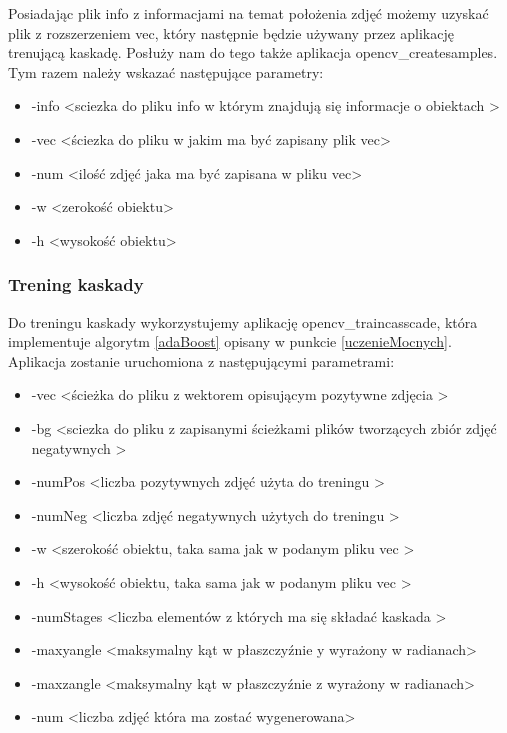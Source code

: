 Posiadając plik info z informacjami na temat położenia zdjęć możemy uzyskać plik z rozszerzeniem vec, który następnie będzie używany przez aplikację trenującą kaskadę. Posłuży nam do tego także aplikacja opencv\_createsamples. Tym razem należy wskazać następujące parametry:

\begin{itemize}
    \item -info \textless sciezka do pliku info w którym znajdują się informacje o obiektach \textgreater
    \item -vec \textless ściezka do pliku w jakim ma być zapisany plik vec\textgreater
    \item -num \textless ilość zdjęć jaka ma być zapisana w pliku vec\textgreater
    \item -w \textless zerokość obiektu\textgreater
    \item -h \textless wysokość obiektu\textgreater

\end{itemize}

\subsubsection{Trening kaskady}

Do treningu kaskady wykorzystujemy aplikację opencv\_traincasscade, która implementuje algorytm \ref{adaBoost} opisany w punkcie \ref{uczenieMocnych}. Aplikacja zostanie uruchomiona z następującymi parametrami:

\begin{itemize}
    \item -vec \textless ścieżka do pliku z wektorem opisującym pozytywne zdjęcia \textgreater
    \item -bg \textless sciezka do pliku z zapisanymi ścieżkami plików tworzących zbiór zdjęć negatywnych \textgreater
    \item -numPos \textless liczba pozytywnych zdjęć użyta do treningu \textgreater
    \item -numNeg \textless liczba zdjęć negatywnych użytych do treningu \textgreater
    \item -w \textless szerokość obiektu, taka sama jak w podanym pliku vec \textgreater
    \item -h \textless wysokość obiektu, taka sama jak w podanym pliku vec \textgreater
    \item -numStages \textless liczba elementów z których ma się składać kaskada \textgreater
    \item -maxyangle \textless maksymalny kąt w płaszczyźnie y wyrażony w radianach\textgreater
    \item -maxzangle \textless maksymalny kąt w płaszczyźnie z wyrażony w radianach\textgreater
    \item -num \textless liczba zdjęć która ma zostać wygenerowana>

\end{itemize}

